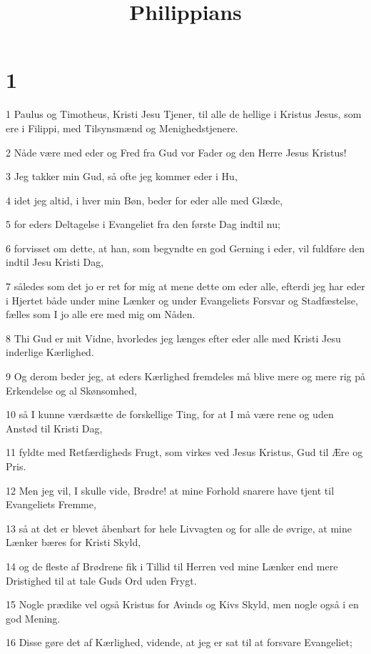 

\title{Philippians}


\chapter{1}

\par 1 Paulus og Timotheus, Kristi Jesu Tjener, til alle de hellige i Kristus Jesus, som ere i Filippi, med Tilsynsmænd og Menighedstjenere.
\par 2 Nåde være med eder og Fred fra Gud vor Fader og den Herre Jesus Kristus!
\par 3 Jeg takker min Gud, så ofte jeg kommer eder i Hu,
\par 4 idet jeg altid, i hver min Bøn, beder for eder alle med Glæde,
\par 5 for eders Deltagelse i Evangeliet fra den første Dag indtil nu;
\par 6 forvisset om dette, at han, som begyndte en god Gerning i eder, vil fuldføre den indtil Jesu Kristi Dag,
\par 7 således som det jo er ret for mig at mene dette om eder alle, efterdi jeg har eder i Hjertet både under mine Lænker og under Evangeliets Forsvar og Stadfæstelse, fælles som I jo alle ere med mig om Nåden.
\par 8 Thi Gud er mit Vidne, hvorledes jeg længes efter eder alle med Kristi Jesu inderlige Kærlighed.
\par 9 Og derom beder jeg, at eders Kærlighed fremdeles må blive mere og mere rig på Erkendelse og al Skønsomhed,
\par 10 så I kunne værdsætte de forskellige Ting, for at I må være rene og uden Anstød til Kristi Dag,
\par 11 fyldte med Retfærdigheds Frugt, som virkes ved Jesus Kristus, Gud til Ære og Pris.
\par 12 Men jeg vil, I skulle vide, Brødre! at mine Forhold snarere have tjent til Evangeliets Fremme,
\par 13 så at det er blevet åbenbart for hele Livvagten og for alle de øvrige, at mine Lænker bæres for Kristi Skyld,
\par 14 og de fleste af Brødrene fik i Tillid til Herren ved mine Lænker end mere Dristighed til at tale Guds Ord uden Frygt.
\par 15 Nogle prædike vel også Kristus for Avinds og Kivs Skyld, men nogle også i en god Mening.
\par 16 Disse gøre det af Kærlighed, vidende, at jeg er sat til at forsvare Evangeliet;
